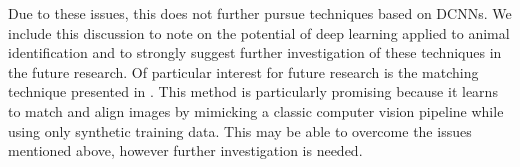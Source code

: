         Due to these issues, this \thesis{} does not further pursue techniques based on DCNNs. We include this
        discussion to note on the potential of deep learning applied to animal identification and to strongly suggest
        further investigation of these techniques in the future research. Of particular interest for future research is
        the matching technique presented in \cite{rocco_convolutional_2017}. This method is particularly promising
        because it learns to match and align images by mimicking a classic computer vision pipeline while using only
        synthetic training data. This may be able to overcome the issues mentioned above, however further investigation
        is needed.


